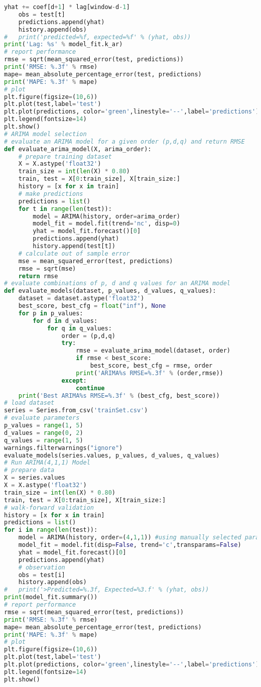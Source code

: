 \begin{lstlisting}[language=Python]
		yhat += coef[d+1] * lag[window-d-1]
	obs = test[t]
	predictions.append(yhat)
	history.append(obs)
#	print('predicted=%f, expected=%f' % (yhat, obs))
print('Lag: %s' % model_fit.k_ar)
# report performance
rmse = sqrt(mean_squared_error(test, predictions))
print('RMSE: %.3f' % rmse)
mape= mean_absolute_percentage_error(test, predictions)
print('MAPE: %.3f' % mape)
# plot
plt.figure(figsize=(10,6))
plt.plot(test,label='test')
plt.plot(predictions, color='green',linestyle='--',label='predictions')
plt.legend(fontsize=14)
plt.show()
# ARIMA model selection
# evaluate an ARIMA model for a given order (p,d,q) and return RMSE
def evaluate_arima_model(X, arima_order):
	# prepare training dataset
	X = X.astype('float32')
	train_size = int(len(X) * 0.80)
	train, test = X[0:train_size], X[train_size:]
	history = [x for x in train]
	# make predictions
	predictions = list()
	for t in range(len(test)):
		model = ARIMA(history, order=arima_order)
		model_fit = model.fit(trend='nc', disp=0)
		yhat = model_fit.forecast()[0]
		predictions.append(yhat)
		history.append(test[t])
	# calculate out of sample error
	mse = mean_squared_error(test, predictions)
	rmse = sqrt(mse)
	return rmse
# evaluate combinations of p, d and q values for an ARIMA model
def evaluate_models(dataset, p_values, d_values, q_values):
	dataset = dataset.astype('float32')
	best_score, best_cfg = float("inf"), None
	for p in p_values:
		for d in d_values:
			for q in q_values:
				order = (p,d,q)
				try:
					rmse = evaluate_arima_model(dataset, order)
					if rmse < best_score:
						best_score, best_cfg = rmse, order
					print('ARIMA%s RMSE=%.3f' % (order,rmse))
				except:
					continue
	print('Best ARIMA%s RMSE=%.3f' % (best_cfg, best_score))
# load dataset
series = Series.from_csv('trainSet.csv')
# evaluate parameters
p_values = range(1, 5)
d_values = range(0, 2)
q_values = range(1, 5)
warnings.filterwarnings("ignore")
evaluate_models(series.values, p_values, d_values, q_values)
# Run ARIMA(4,1,1) Model
# prepare data
X = series.values
X = X.astype('float32')
train_size = int(len(X) * 0.80)
train, test = X[0:train_size], X[train_size:]
# walk-forward validation
history = [x for x in train]
predictions = list()
for i in range(len(test)):
	model = ARIMA(history, order=(4,1,1)) #using manually selected paratments
	model_fit = model.fit(disp=False, trend='c',transparams=False)
	yhat = model_fit.forecast()[0]
	predictions.append(yhat)
	# observation
	obs = test[i]
	history.append(obs)
#	print('>Predicted=%.3f, Expected=%3.f' % (yhat, obs))
print(model_fit.summary())   
# report performance
rmse = sqrt(mean_squared_error(test, predictions))
print('RMSE: %.3f' % rmse)
mape= mean_absolute_percentage_error(test, predictions)
print('MAPE: %.3f' % mape)
# plot
plt.figure(figsize=(10,6))
plt.plot(test,label='test')
plt.plot(predictions, color='green',linestyle='--',label='predictions')
plt.legend(fontsize=14)
plt.show()
\end{lstlisting}

